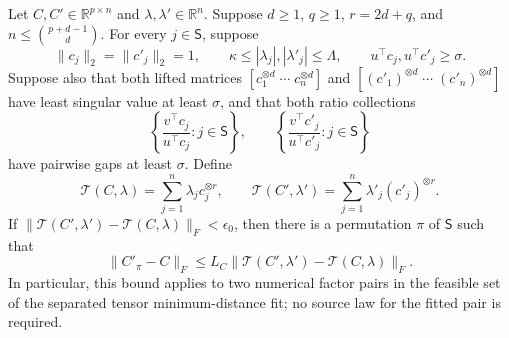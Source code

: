 Let \(C,C'\in\mathbb R^{p\times n}\) and \(\lambda,\lambda'\in\mathbb R^n\). Suppose \(d\ge1\), \(q\ge1\), \(r=2d+q\), and \(n\le\binom{p+d-1}{d}\). For every \(j\in\mathsf S\), suppose
\[
 \lVert c_j\rVert_2=\lVert c'_j\rVert_2=1,
 \qquad
 \kappa\le |\lambda_j|,|\lambda'_j|\le\Lambda,
 \qquad
 u^\top c_j,u^\top c'_j\ge\sigma.
\]
Suppose also that both lifted matrices \([c_1^{\otimes d}\;\cdots\;c_n^{\otimes d}]\) and \([(c'_1)^{\otimes d}\;\cdots\;(c'_n)^{\otimes d}]\) have least singular value at least \(\sigma\), and that both ratio collections
\[
 \left\{\frac{v^\top c_j}{u^\top c_j}:j\in\mathsf S\right\},
 \qquad
 \left\{\frac{v^\top c'_j}{u^\top c'_j}:j\in\mathsf S\right\}
\]
have pairwise gaps at least \(\sigma\). Define
\[
 \mathcal T(C,\lambda)=\sum_{j=1}^n\lambda_jc_j^{\otimes r},
 \qquad
 \mathcal T(C',\lambda')=\sum_{j=1}^n\lambda'_j(c'_j)^{\otimes r}.
\]
If \(\lVert\mathcal T(C',\lambda')-\mathcal T(C,\lambda)\rVert_F<\epsilon_0\), then there is a permutation \(\pi\) of \(\mathsf S\) such that
\[
 \lVert C'_{\pi}-C\rVert_F
 \le L_C\lVert\mathcal T(C',\lambda')-\mathcal T(C,\lambda)\rVert_F.
\]
In particular, this bound applies to two numerical factor pairs in the feasible set of the separated tensor minimum-distance fit; no source law for the fitted pair is required.